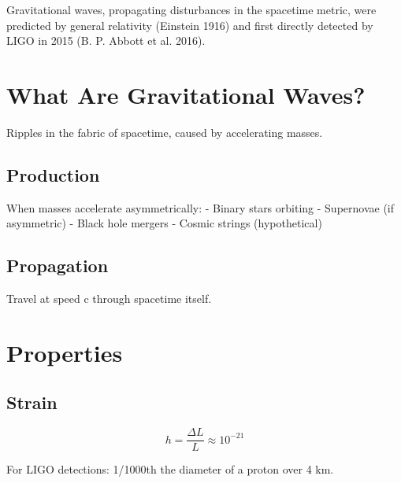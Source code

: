 \documentclass[
  11pt,
  letterpaper,
  twoside,
  openright]{book}
\begin{document}
\begin{tcolorbox}[enhanced jigsaw, coltitle=black, colbacktitle=quarto-callout-note-color!10!white, toprule=.15mm, colframe=quarto-callout-note-color-frame, arc=.35mm, opacityback=0, bottomtitle=1mm, toptitle=1mm, breakable, colback=white, titlerule=0mm, opacitybacktitle=0.6, title=\textcolor{quarto-callout-note-color}{\faInfo}\hspace{0.5em}{Key Insight}, rightrule=.15mm, bottomrule=.15mm, leftrule=.75mm, left=2mm]

Gravitational waves, propagating disturbances in the spacetime metric,
were predicted by general relativity (Einstein 1916) and first directly
detected by LIGO in 2015 (B. P. Abbott et al. 2016).

\end{tcolorbox}

\section{What Are Gravitational
Waves?}\label{what-are-gravitational-waves}

Ripples in the fabric of spacetime, caused by accelerating masses.

\subsection{Production}\label{production}

When masses accelerate asymmetrically: - Binary stars orbiting -
Supernovae (if asymmetric) - Black hole mergers - Cosmic strings
(hypothetical)

\subsection{Propagation}\label{propagation}

Travel at speed c through spacetime itself.

\section{Properties}\label{properties-20}

\subsection{Strain}\label{strain}

\[
h = \frac{\Delta L}{L} \approx 10^{-21}
\]

For LIGO detections: 1/1000th the diameter of a proton over 4 km.
\end{document}
